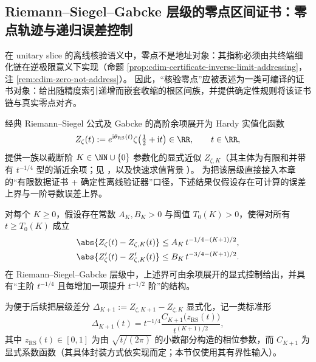 \subsection{Riemann--Siegel--Gabcke 层级的零点区间证书：零点轨迹与递归误差控制}\label{subsec:cdim-rs-gabcke-zero-recursion}
在 unitary slice 的离线核验语义中，零点不是地址对象：其指称必须由共终端细化链在逆极限意义下实现（命题 \ref{prop:cdim-certificate-inverse-limit-addressing}，注 \ref{rem:cdim-zero-not-address}）。
因此，“核验零点”应被表述为一类可编译的证书对象：给出随精度索引递增而嵌套收缩的根区间族，并提供确定性规则将该证书链与真实零点对齐。
\par
经典 Riemann--Siegel 公式及 Gabcke 的高阶余项展开为 Hardy 实值化函数
\begin{equation}\label{eq:cdim-hardyzeta-def}
Z_{\zeta}(t):=e^{\mathrm{i}\theta_{\mathrm{RS}}(t)}\zeta\!\left(\tfrac12+\mathrm{i}t\right)\in\RR,\qquad t\in\RR,
\end{equation}
提供一族以截断阶 \(K\in\NN\cup\{0\}\) 参数化的显式近似 \(Z_{\zeta,K}\)（其主体为有限和并带有 \(t^{-1/4}\) 型的渐近余项；见 \cite{Titchmarsh1986RiemannZeta,Gabcke1979RiemannSiegelRemainder}，以及快速求值背景 \cite{Hiary2011FastZeta}）。
为把该层级直接接入本章的“有限数据证书 + 确定性离线验证器”口径，下述结果仅假设存在可计算的误差上界与一阶导数误差上界。
\par
对每个 \(K\ge 0\)，假设存在常数 \(A_K,B_K>0\) 与阈值 \(T_0(K)>0\)，使得对所有 \(t\ge T_0(K)\) 成立
\begin{align}
\abs{Z_{\zeta}(t)-Z_{\zeta,K}(t)}
&\le A_K\,t^{-1/4-(K+1)/2},\label{eq:cdim-rs-gabcke-error0}\\
\abs{Z_{\zeta}'(t)-Z_{\zeta,K}'(t)}
&\le B_K\,t^{-3/4-(K+1)/2}.\label{eq:cdim-rs-gabcke-error1}
\end{align}
在 Riemann--Siegel--Gabcke 层级中，上述界可由余项展开的显式控制给出，并具有“主阶 \(t^{-1/4}\) 且每增加一项提升 \(t^{-1/2}\) 阶”的结构。
\par
为便于后续把层级差分 \(\Delta_{K+1}:=Z_{\zeta,K+1}-Z_{\zeta,K}\) 显式化，记一类标准形
\begin{equation}\label{eq:cdim-rs-gabcke-delta}
\Delta_{K+1}(t)=t^{-1/4}\frac{C_{K+1}\!\bigl(z_{\mathrm{RS}}(t)\bigr)}{t^{(K+1)/2}},
\end{equation}
其中 \(z_{\mathrm{RS}}(t)\in[0,1]\) 为由 \(\sqrt{t/(2\pi)}\) 的小数部分构造的相位参数，而 \(C_{K+1}\) 为显式系数函数（其具体封装方式依实现而定；本节仅使用其有界性输入）。

